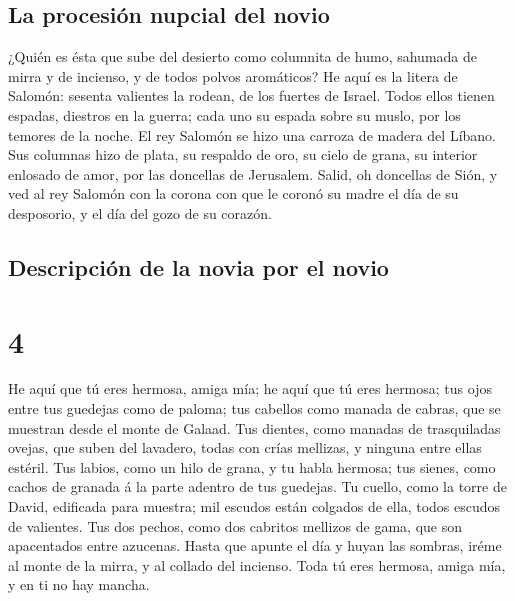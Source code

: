 \hypertarget{la-procesiuxf3n-nupcial-del-novio}{%
\subsection{La procesión nupcial del
novio}\label{la-procesiuxf3n-nupcial-del-novio}}

 ¿Quién es ésta que sube del desierto como columnita de
humo, sahumada de mirra y de incienso, y de todos polvos aromáticos?
 He aquí es la litera de Salomón: sesenta valientes la
rodean, de los fuertes de Israel.  Todos ellos tienen
espadas, diestros en la guerra; cada uno su espada sobre su muslo, por
los temores de la noche.  El rey Salomón se hizo una
carroza de madera del Líbano.  Sus columnas hizo de
plata, su respaldo de oro, su cielo de grana, su interior enlosado de
amor, por las doncellas de Jerusalem.  Salid, oh
doncellas de Sión, y ved al rey Salomón con la corona con que le coronó
su madre el día de su desposorio, y el día del gozo de su corazón.

\hypertarget{descripciuxf3n-de-la-novia-por-el-novio}{%
\subsection{Descripción de la novia por el
novio}\label{descripciuxf3n-de-la-novia-por-el-novio}}

\hypertarget{section-3}{%
\section{4}\label{section-3}}

 He aquí que tú eres hermosa, amiga mía; he aquí que tú
eres hermosa; tus ojos entre tus guedejas como de paloma; tus cabellos
como manada de cabras, que se muestran desde el monte de Galaad.
 Tus dientes, como manadas de trasquiladas ovejas, que
suben del lavadero, todas con crías mellizas, y ninguna entre ellas
estéril.  Tus labios, como un hilo de grana, y tu habla
hermosa; tus sienes, como cachos de granada á la parte adentro de tus
guedejas.  Tu cuello, como la torre de David, edificada
para muestra; mil escudos están colgados de ella, todos escudos de
valientes.  Tus dos pechos, como dos cabritos mellizos de
gama, que son apacentados entre azucenas.  Hasta que
apunte el día y huyan las sombras, iréme al monte de la mirra, y al
collado del incienso.  Toda tú eres hermosa, amiga mía, y
en ti no hay mancha.


